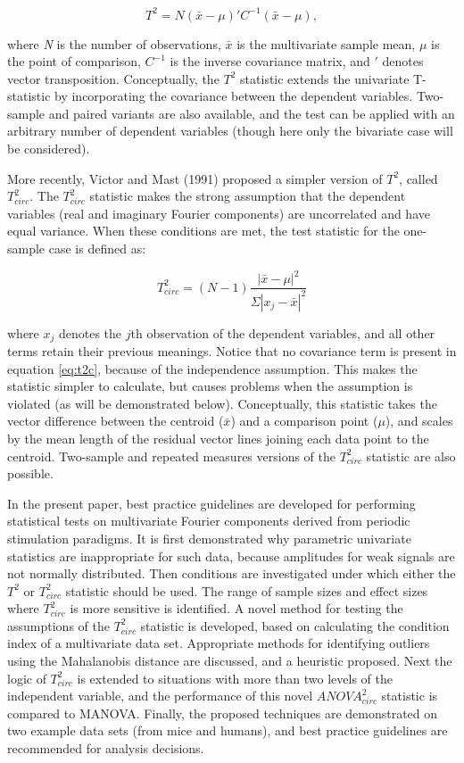 \documentclass[]{article}
\begin{document}
\begin{equation}
\label{eq:t2eq}
T^2 = N(\bar{x} - \mu)' C^{-1} (\bar{x} - \mu),
\end{equation}

where \emph{N} is the number of observations, \(\bar{x}\) is the multivariate sample mean, \(\mu\) is the point of comparison, \(C^{-1}\) is the inverse covariance matrix, and \('\) denotes vector transposition. Conceptually, the \(T^2\) statistic extends the univariate T-statistic by incorporating the covariance between the dependent variables. Two-sample and paired variants are also available, and the test can be applied with an arbitrary number of dependent variables (though here only the bivariate case will be considered).

More recently, Victor and Mast (1991) proposed a simpler version of \(T^2\), called \(T^2_{circ}\). The \(T^2_{circ}\) statistic makes the strong assumption that the dependent variables (real and imaginary Fourier components) are uncorrelated and have equal variance. When these conditions are met, the test statistic for the one-sample case is defined as:

\begin{equation}
\label{eq:t2c}
T^2_{circ} = (N-1)\frac{|\bar{x}-\mu|^2}{\Sigma|x_j - \bar{x}|^2}
\end{equation}

where \(x_j\) denotes the \(j\)th observation of the dependent variables, and all other terms retain their previous meanings. Notice that no covariance term is present in equation \eqref{eq:t2c}, because of the independence assumption. This makes the statistic simpler to calculate, but causes problems when the assumption is violated (as will be demonstrated below). Conceptually, this statistic takes the vector difference between the centroid (\(\bar{x}\)) and a comparison point (\(\mu\)), and scales by the mean length of the residual vector lines joining each data point to the centroid. Two-sample and repeated measures versions of the \(T^2_{circ}\) statistic are also possible.

In the present paper, best practice guidelines are developed for performing statistical tests on multivariate Fourier components derived from periodic stimulation paradigms. It is first demonstrated why parametric univariate statistics are inappropriate for such data, because amplitudes for weak signals are not normally distributed. Then conditions are investigated under which either the \(T^2\) or \(T^2_{circ}\) statistic should be used. The range of sample sizes and effect sizes where \(T^2_{circ}\) is more sensitive is identified. A novel method for testing the assumptions of the \(T^2_{circ}\) statistic is developed, based on calculating the condition index of a multivariate data set. Appropriate methods for identifying outliers using the Mahalanobis distance are discussed, and a heuristic proposed. Next the logic of \(T^2_{circ}\) is extended to situations with more than two levels of the independent variable, and the performance of this novel \(ANOVA^2_{circ}\) statistic is compared to MANOVA. Finally, the proposed techniques are demonstrated on two example data sets (from mice and humans), and best practice guidelines are recommended for analysis decisions.
\end{document}
